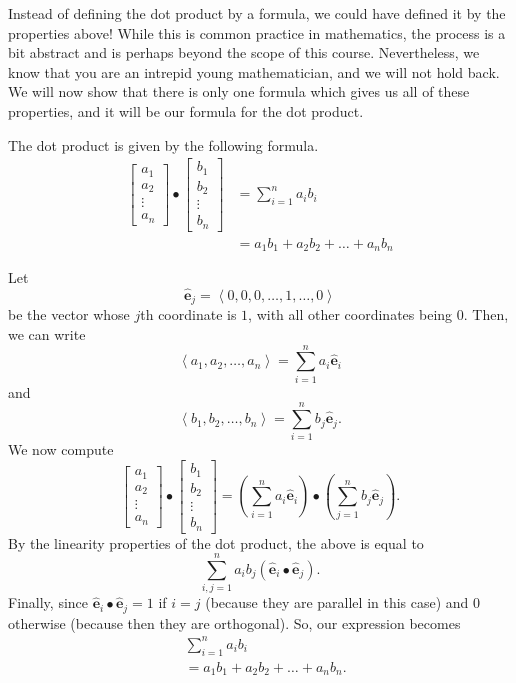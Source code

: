 \documentclass{ximera}
\begin{document}
Instead of defining the dot product by a formula, we could have
defined it by the properties above!  While this is common practice in
mathematics, the process is a bit abstract and is perhaps beyond the scope of
this course. Nevertheless, we know that you are an intrepid young
mathematician, and we will not hold back.  We will now show that there
is only one formula which gives us all of these properties, and it
will be our formula for the dot product.

\begin{theorem}
  The dot product is given by the following formula.
    \begin{align*}
  \begin{bmatrix}
    a_1\\
    a_2\\
    \vdots\\
    a_n
  \end{bmatrix}
  \bullet
  \begin{bmatrix}
    b_1\\
    b_2\\
    \vdots\\
    b_n
  \end{bmatrix}
  &= \sum_{i=1}^n a_ib_i\\
  &= a_1b_1 + a_2b_2 +\dots+a_nb_n
    \end{align*}
\begin{explanation}
  Let 
  \[
  \mathbf{\hat{e}}_j = \left\langle 0,0,0,\dots,1,\dots,0 \right\rangle
  \]	
  be the vector whose $j$th coordinate is $1$, with all other
  coordinates being $0$. Then, we can write
  \[ 
  \left\langle a_1,a_2, \dots,a_n \right\rangle = \sum_{i=1}^n a_i \mathbf{\hat{e}}_i
  \]
  and
  \[ 
  \left\langle b_1,b_2, \dots,b_n \right\rangle = \sum_{i=1}^n b_j \mathbf{\hat{e}}_j.
  \]	 
    We now compute
    \[
    \begin{bmatrix}
      a_1\\
      a_2\\
      \vdots\\
      a_n
    \end{bmatrix}
    \bullet
    \begin{bmatrix}
      b_1\\
      b_2\\
      \vdots\\
      b_n
    \end{bmatrix} = \left(\sum_{i=1}^n a_i \mathbf{\hat{e}}_i\right) \bullet \left(\sum_{j=1}^n b_j \mathbf{\hat{e}}_j\right).
    \]
    By the linearity properties of the dot product, the above is equal to
    \[
    \sum_{i,j =1}^n a_ib_j(\mathbf{\hat{e}}_i \bullet \mathbf{\hat{e}}_j).
    \]
    Finally, since $\mathbf{\hat{e}}_i \bullet \mathbf{\hat{e}}_j = 1$ if $i=j$ (because they are
    parallel in this case) and $0$ otherwise (because then they are
    orthogonal).  So, our expression becomes
    \begin{align*}
    &\sum_{i=1}^n a_ib_i \\
    &=a_1b_1 + a_2b_2 +\dots+a_nb_n.
    \end{align*}
\end{explanation}
\end{theorem}
\end{document}
